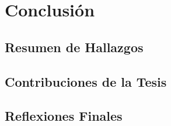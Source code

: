 \documentclass[../Main.tex]{subfiles}
\begin{document}
\section{Conclusión}

\subsection{Resumen de Hallazgos}
\lipsum[1] %

\subsection{Contribuciones de la Tesis}
\lipsum[2] %

\subsection{Reflexiones Finales}
\lipsum[3] %

\biblio 
\end{document}
